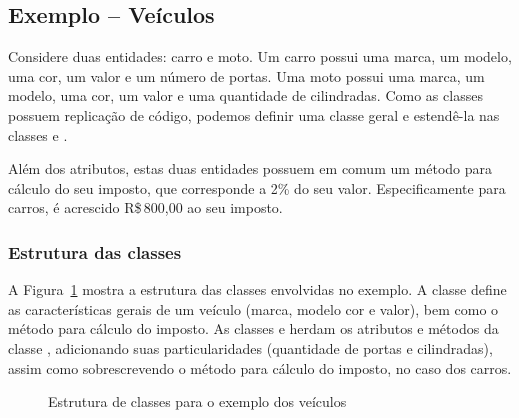 \subsection{Exemplo -- Veículos}
Considere duas entidades: carro e moto. Um carro possui uma marca, um modelo, uma cor, um valor e um número de portas. Uma moto possui uma marca, um modelo, uma cor, um valor e uma quantidade de cilindradas. Como as classes possuem replicação de código, podemos definir uma classe geral e estendê-la nas classes  e .

Além dos atributos, estas duas entidades possuem em comum um método para cálculo do seu imposto, que corresponde a 2\% do seu valor. Especificamente para carros, é acrescido R\$\,800,00 ao seu imposto.

\subsubsection{Estrutura das classes}

A Figura~\ref{fig:exemplo-carro-moto} mostra a estrutura das classes envolvidas no exemplo. A classe  define as características gerais de um veículo (marca, modelo cor e valor), bem como o método para cálculo do imposto. As classes  e  herdam os atributos e métodos da classe , adicionando suas particularidades (quantidade de portas e cilindradas), assim como sobrescrevendo o método para cálculo do imposto, no caso dos carros.

\begin{figure}[h]
	\centering
	
	
	\caption{Estrutura de classes para o exemplo dos veículos}
	\label{fig:exemplo-carro-moto}
\end{figure}

